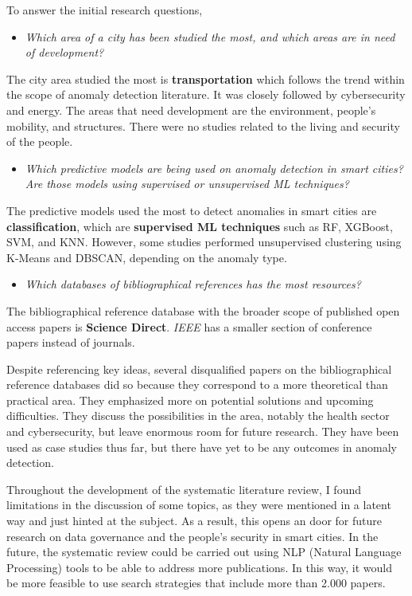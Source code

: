 \documentclass[a4paper,12pt,twoside]{ThesisStyle}
\begin{document}
To answer the initial research questions, 
\begin{itemize}
  \item \textit{Which area of a city has been studied the most, and which areas are in need of development?}
\end{itemize}
The city area studied the most is \textbf{transportation} which follows the trend within the scope of anomaly detection literature. It was closely followed by cybersecurity and energy. The areas that need development are the environment, people's mobility, and structures. There were no studies related to the living and security of the people.
\begin{itemize}
  \item \textit{Which predictive models are being used on anomaly detection in smart cities? Are those models using supervised or unsupervised ML techniques?}
\end{itemize}
The predictive models used the most to detect anomalies in smart cities are \textbf{classification}, which are \textbf{supervised ML techniques} such as RF, XGBoost, SVM, and KNN. However, some studies performed unsupervised clustering using K-Means and DBSCAN, depending on the anomaly type.
\begin{itemize}
  \item \textit{Which databases of bibliographical references has the most resources?}
\end{itemize}
The bibliographical reference database with the broader scope of published open access papers is \textbf{Science Direct}. \textit{IEEE} has a smaller section of conference papers instead of journals.

Despite referencing key ideas, several disqualified papers on the bibliographical reference databases did so because they correspond to a more theoretical than practical area. They emphasized more on potential solutions and upcoming difficulties. They discuss the possibilities in the area, notably the health sector and cybersecurity, but leave enormous room for future research. They have been used as case studies thus far, but there have yet to be any outcomes in anomaly detection. 

Throughout the development of the systematic literature review, I found limitations in the discussion of some topics, as they were mentioned in a latent way and just hinted at the subject. As a result, this opens an door for future research on data governance and the people's security in smart cities. In the future, the systematic review could be carried out using NLP (Natural Language Processing) tools to be able to address more publications. In this way, it would be more feasible to use search strategies that include more than 2.000 papers.
\end{document}

